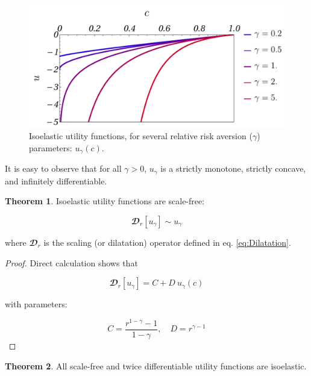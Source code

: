 \documentclass{article}
\theoremstyle{definition}
\newtheorem{theorem}{Theorem}[section]
\begin{document}
\begin{figure}[H]
    \centering
    \includegraphics[width=12 cm]{img/u_gamma_c.pdf}
    \caption{Isoelastic utility functions, for several relative risk aversion ($\gamma$) parameters: $u_\gamma(c)$.}
    \label{fig:IsoelasticUtility}
\end{figure}

It is easy to observe that for all $\gamma > 0$, $u_\gamma$ is a strictly monotone, strictly concave, and infinitely differentiable.

\begin{theorem}
    Isoelastic utility functions are scale-free:

    \begin{equation}
        \mathbfcal{D}_r[u_\gamma] \sim u_\gamma
    \end{equation}

    where $\mathbfcal{D}_r$ is the scaling (or dilatation) operator defined in eq. \eqref{eq:Dilatation}.
    
\end{theorem}

\begin{proof}
    Direct calculation shows that
    
    \begin{equation}
        \mathbfcal{D}_r[u_\gamma] = C + D \ u_\gamma(c)
    \end{equation}

    with parameters:

    \begin{equation}
        C = \frac{r^{1-\gamma}-1}{1-\gamma}, \quad D = r^{\gamma -1}
    \end{equation}
\end{proof}

\begin{theorem}
    All scale-free and twice differentiable utility functions are isoelastic.
    
\end{theorem}
\end{document}
